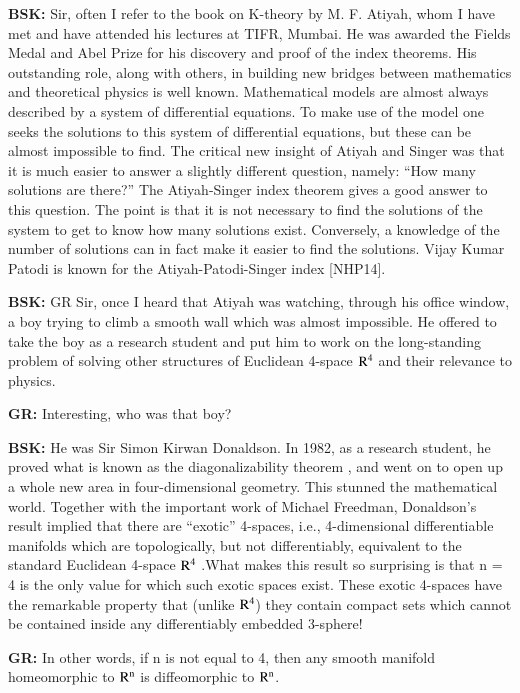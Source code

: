 \textbf{BSK:} Sir, often I refer to the book on K-theory by M. F. Atiyah, whom I have met  and have attended his lectures at TIFR, Mumbai. He was awarded the Fields Medal and Abel Prize for his discovery and proof of the index theorems. His outstanding role, along with others, in building new bridges between mathematics and theoretical physics is well known. Mathematical models are almost always described by a system of differential equations. To make use of the model one seeks the solutions to this system of differential equations, but these can be almost impossible to find. The critical new insight of Atiyah and Singer was that it is much easier to answer a slightly different question, namely: “How many solutions are there?” The Atiyah-Singer index theorem gives a good answer to this question. The point is that it is not necessary to find the solutions of the system to get to know how many solutions exist. Conversely, a knowledge of the number of solutions can in fact make it easier to find the solutions. Vijay Kumar Patodi is known for the Atiyah-Patodi-Singer index [NHP14].

\textbf{BSK:} GR Sir, once I heard that Atiyah was watching, through his office window, a boy trying to climb a smooth wall which was almost impossible. He offered to take the boy as a research student and put him to work on the long-standing problem of solving other structures of Euclidean 4-space ${\rm R}^{4}$ and their relevance to physics.

\textbf{GR:} Interesting, who was that boy?

\textbf{BSK:} He was Sir Simon Kirwan Donaldson. In 1982, as a research student, he proved what is known as the diagonalizability theorem \cite{chap17-key08SD}, and went on to open up a whole new area in four-dimensional geometry. This stunned the mathematical world. Together with the important work of Michael Freedman, Donaldson's result implied that there are “exotic” 4-spaces, i.e., 4-dimensional differentiable manifolds which are topologically, but not differentiably, equivalent to the standard Euclidean 4-space  ${\rm R}^{4}$ .What makes this result so surprising is that n = 4 is the only value for which such exotic spaces exist. These exotic 4-spaces have the remarkable property that (unlike ${\rm R}^{4}$) they contain compact sets which cannot be contained inside any differentiably embedded 3-sphere!

\textbf{GR:} In other words, if n is not equal to 4, then any smooth manifold homeomorphic to ${\rm R}^{\rm n}$ is diffeomorphic to ${\rm R}^{\rm n}$.

